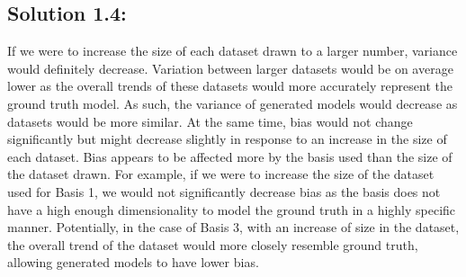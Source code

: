 \documentclass[submit]{harvardml}
\begin{document}
\subsection*{Solution 1.4:}
If we were to increase the size of each dataset drawn to a larger number, variance would definitely decrease. Variation between larger datasets would be on average lower as the overall trends of these datasets would more accurately represent the ground truth model. As such, the variance of generated models would decrease as datasets would be more similar. At the same time, bias would not change significantly but might decrease slightly in response to an increase in the size of each dataset. Bias appears to be affected more by the basis used than the size of the dataset drawn. For example, if we were to increase the size of the dataset used for Basis 1, we would not significantly decrease bias as the basis does not have a high enough dimensionality to model the ground truth in a highly specific manner. Potentially, in the case of Basis 3, with an increase of size in the dataset, the overall trend of the dataset would more closely resemble ground truth, allowing generated models to have lower bias.
\end{document}
